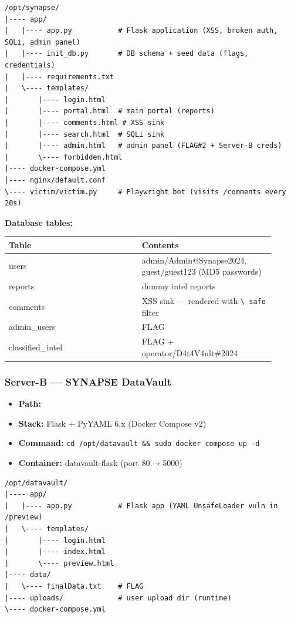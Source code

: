 \begin{lstlisting}
/opt/synapse/
|---- app/
|   |---- app.py           # Flask application (XSS, broken auth, SQLi, admin panel)
|   |---- init_db.py       # DB schema + seed data (flags, credentials)
|   |---- requirements.txt
|   \---- templates/
|       |---- login.html
|       |---- portal.html  # main portal (reports)
|       |---- comments.html # XSS sink
|       |---- search.html  # SQLi sink
|       |---- admin.html   # admin panel (FLAG#2 + Server-B creds)
|       \---- forbidden.html
|---- docker-compose.yml
|---- nginx/default.conf
\---- victim/victim.py     # Playwright bot (visits /comments every 20s)
\end{lstlisting}

\textbf{Database tables:}

{\footnotesize\begin{longtable}[]{@{}>{\raggedright\arraybackslash}p{0.45\linewidth}
  >{\raggedright\arraybackslash}p{0.45\linewidth}@{}}
\toprule\noalign{}
Table & Contents \\
\midrule\noalign{}
\endhead
\bottomrule\noalign{}
\endlastfoot
users & admin/Admin@Synapse2024, guest/guest123 (MD5 passwords) \\
reports & 5 dummy intel reports \\
comments & XSS sink --- rendered with \texttt{\textbackslash{}\textbar{}\ safe} filter \\
admin\_users & FLAG \\
classified\_intel & FLAG + operator/D4t4V4ult\#2024 \\
\end{longtable}}

\subsubsection{Server-B --- SYNAPSE DataVault}

\begin{itemize}
\tightlist
\item
  \textbf{Path:} 
\item
  \textbf{Stack:} Flask + PyYAML 6.x (Docker Compose v2)
\item
  \textbf{Command:} \texttt{cd\ /opt/datavault\ \&\&\ sudo\ docker\ compose\ up\ -d}
\item
  \textbf{Container:} datavault-flask (port 80$\rightarrow$5000)
\end{itemize}

\begin{lstlisting}
/opt/datavault/
|---- app/
|   |---- app.py           # Flask app (YAML UnsafeLoader vuln in /preview)
|   \---- templates/
|       |---- login.html
|       |---- index.html
|       \---- preview.html
|---- data/
|   \---- finalData.txt    # FLAG
|---- uploads/             # user upload dir (runtime)
\---- docker-compose.yml
\end{lstlisting}

